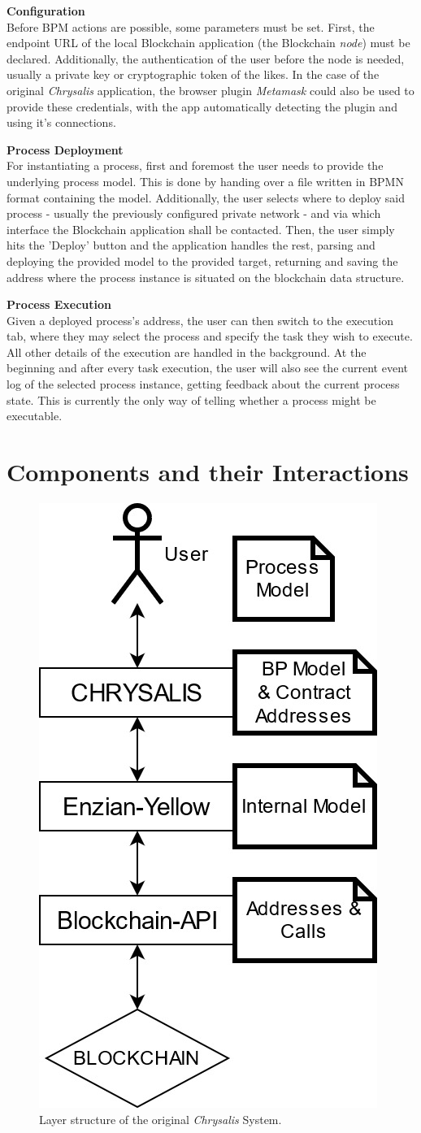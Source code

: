 \textbf{Configuration} \\[0.2em]
Before BPM actions are possible, some parameters must be set. First, the endpoint URL of the local Blockchain application (the Blockchain \emph{node}) must be declared. Additionally, the authentication of the user before the node is needed, usually a private key or cryptographic token of the likes. In the case of the original \emph{Chrysalis} application, the browser plugin \emph{Metamask} could also be used to provide these credentials, with the app automatically detecting the plugin and using it's connections.

\textbf{Process Deployment} \\[0.2em]
For instantiating a process, first and foremost the user needs to provide the underlying process model. This is done by handing over a file written in BPMN format containing the model. Additionally, the user selects where to deploy said process - usually the previously configured private network - and via which interface the Blockchain application shall be contacted. Then, the user simply hits the 'Deploy' button and the application handles the rest, parsing and deploying the provided model to the provided target, returning and saving the address where the process instance is situated on the blockchain data structure.

\textbf{Process Execution} \\[0.2em]
Given a deployed process's address, the user can then switch to the execution tab, where they may select the process and specify the task they wish to execute. All other details of the execution are handled in the background. At the beginning and after every task execution, the user will also see the current event log of the selected process instance, getting feedback about the current process state. This is currently the only way of telling whether a process might be executable.

\section{Components and their Interactions}
\label{sec:init:components}


\begin{figure}[h]
	\centering
	\captionsetup{justification=centering,margin=2cm}
	\includegraphics[height=0.5\textwidth]{gfx/init-components-layers}
	\caption{Layer structure of the original \emph{Chrysalis} System.}
	\label{fig:init:components:layers}
\end{figure}

